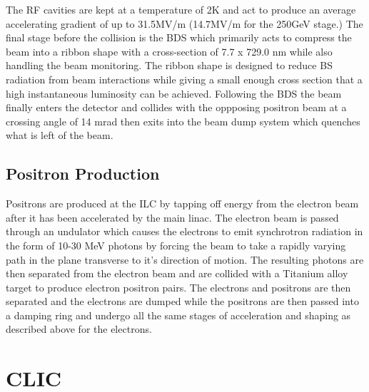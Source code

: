 The \ac{RF} cavities are kept at a temperature of 2K and act to produce an average accelerating gradient of up to 31.5MV/m (14.7MV/m for the 250GeV stage.)  The final stage before the collision is the \ac{BDS} which primarily acts to compress the beam into a ribbon shape with a cross-section of 7.7 x 729.0 nm while also handling the beam monitoring. The ribbon shape is designed to reduce \ac{BS} radiation from beam interactions while giving a small enough cross section that a high instantaneous luminosity can be achieved. Following the \ac{BDS} the beam finally enters the detector and collides with the oppposing positron beam at a crossing angle of 14 mrad then exits into the beam dump system which quenches what is left of the beam.

\subsection{Positron Production}
Positrons are produced at the \ac{ILC} by tapping off energy from the electron beam after it has been accelerated by the main linac. The electron beam is passed through an undulator which causes the electrons to emit synchrotron radiation in the form of 10-30 MeV photons by forcing the beam to take a rapidly varying path in the plane transverse to it's direction of motion. The resulting photons are then separated from the electron beam and are collided with a Titanium alloy target to produce electron positron pairs. The electrons and positrons are then separated and the electrons are dumped while the positrons are then passed into a damping ring and undergo all the same stages of acceleration and shaping as described above for the electrons.

\section{CLIC}

